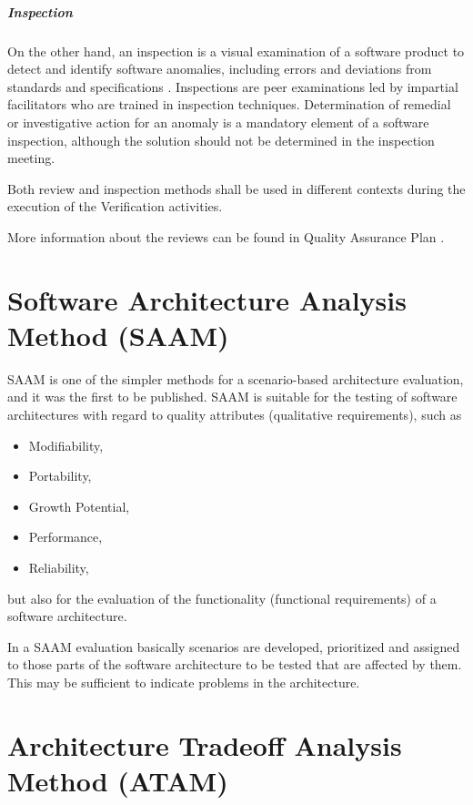 \paragraph{Inspection}
On the other hand, an inspection is a visual examination of a software
product to detect and identify software anomalies, including errors
and deviations from standards and specifications
\cite{Fag76-99}. Inspections are peer examinations led by impartial
facilitators who are trained in inspection techniques. Determination
of remedial or investigative action for an anomaly is a mandatory
element of a software inspection, although the solution should not be
determined in the inspection meeting.

Both review and inspection methods shall be used in different
contexts during the execution of the Verification activities.

More information about the reviews can be found in Quality Assurance Plan
\cite{QAplan}.

\chapter{Software Architecture Analysis Method (SAAM)}

SAAM \cite{KABC96} is one of the simpler methods for a scenario-based
architecture evaluation, and it was the first to be published. SAAM is
suitable for the testing of software architectures with regard to
quality attributes (qualitative requirements), such as
%
\begin{itemize}
\item Modifiability,
\item Portability,
\item Growth Potential,
\item Performance,
\item Reliability,
\end{itemize}
%
but also for the evaluation of the functionality (functional 
requirements) of a software architecture. 

In a SAAM evaluation basically scenarios are developed, 
prioritized and assigned to those parts of the software 
architecture to be tested that are affected by them. 
This may be sufficient to indicate problems in the architecture.

\chapter{Architecture Tradeoff Analysis Method (ATAM)}	
\label{sec:atam}


